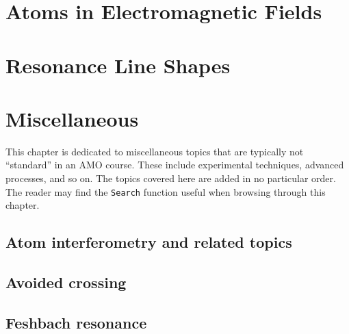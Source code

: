 \documentclass{book}
\theoremstyle{definition}
\begin{document}
\chapter{Atoms in Electromagnetic Fields}














\chapter{Resonance Line Shapes}










\chapter{Miscellaneous}

This chapter is dedicated to miscellaneous topics that are typically not ``standard'' in an AMO course. These include experimental techniques, advanced processes, and so on. The topics covered here are added in no particular order. The reader may find the \texttt{Search} function useful when browsing through this chapter. 

\section{Atom interferometry and related topics}

\section{Avoided crossing}

\section{Feshbach resonance}











 




	
	
\end{document}
